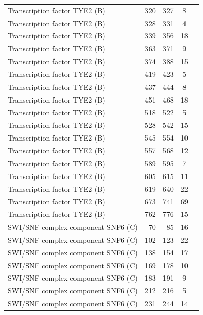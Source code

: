 \begin{longtable}{@{}p{7.5cm}rrrl@{}}
  Transcription factor TYE2 (B) & 320 & 327 & \multicolumn{1}{c}{8} \\
  Transcription factor TYE2 (B) & 328 & 331 & \multicolumn{1}{c}{4} \\
  Transcription factor TYE2 (B) & 339 & 356 & \multicolumn{1}{c}{18} \\
  Transcription factor TYE2 (B) & 363 & 371 & \multicolumn{1}{c}{9} \\
  Transcription factor TYE2 (B) & 374 & 388 & \multicolumn{1}{c}{15} \\
  Transcription factor TYE2 (B) & 419 & 423 & \multicolumn{1}{c}{5} \\
  Transcription factor TYE2 (B) & 437 & 444 & \multicolumn{1}{c}{8} \\
  Transcription factor TYE2 (B) & 451 & 468 & \multicolumn{1}{c}{18} \\
  Transcription factor TYE2 (B) & 518 & 522 & \multicolumn{1}{c}{5} \\
  Transcription factor TYE2 (B) & 528 & 542 & \multicolumn{1}{c}{15} \\
  Transcription factor TYE2 (B) & 545 & 554 & \multicolumn{1}{c}{10} \\
  Transcription factor TYE2 (B) & 557 & 568 & \multicolumn{1}{c}{12} \\
  Transcription factor TYE2 (B) & 589 & 595 & \multicolumn{1}{c}{7} \\
  Transcription factor TYE2 (B) & 605 & 615 & \multicolumn{1}{c}{11} \\
  Transcription factor TYE2 (B) & 619 & 640 & \multicolumn{1}{c}{22} \\
  Transcription factor TYE2 (B) & 673 & 741 & \multicolumn{1}{c}{69} \\
  Transcription factor TYE2 (B) & 762 & 776 & \multicolumn{1}{c}{15} \\
  SWI/SNF complex component SNF6 (C) & 70 & 85 & \multicolumn{1}{c}{16} \\
  SWI/SNF complex component SNF6 (C) & 102 & 123 & \multicolumn{1}{c}{22} \\
  SWI/SNF complex component SNF6 (C) & 138 & 154 & \multicolumn{1}{c}{17} \\
  SWI/SNF complex component SNF6 (C) & 169 & 178 & \multicolumn{1}{c}{10} \\
  SWI/SNF complex component SNF6 (C) & 183 & 191 & \multicolumn{1}{c}{9} \\
  SWI/SNF complex component SNF6 (C) & 212 & 216 & \multicolumn{1}{c}{5} \\
  SWI/SNF complex component SNF6 (C) & 231 & 244 & \multicolumn{1}{c}{14} \\

\end{longtable}
